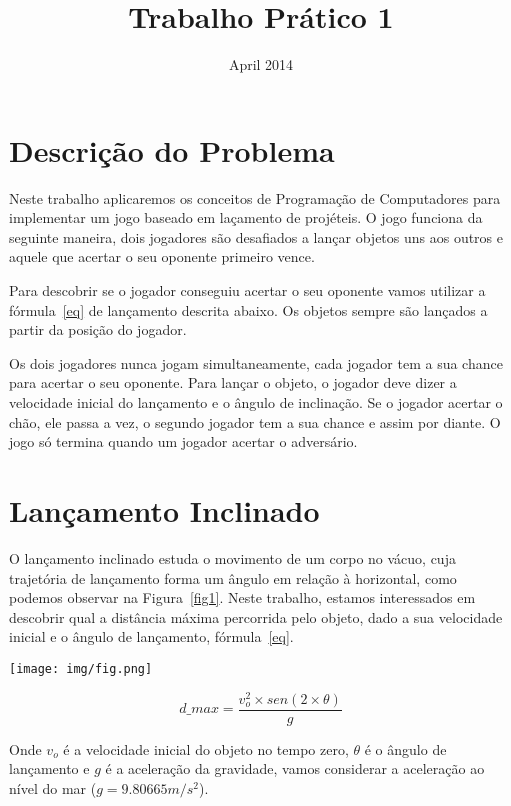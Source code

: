 \documentclass{article}
\title{Trabalho Prático 1}
\date{April 2014}
\begin{document}
\maketitle

\section{Descrição do Problema}
    Neste trabalho aplicaremos os conceitos de Programação de Computadores para implementar um jogo baseado em laçamento de projéteis. O jogo funciona da seguinte maneira, dois jogadores são desafiados a lançar objetos uns aos outros e aquele que acertar o seu oponente primeiro vence. 
    
    Para descobrir se o jogador conseguiu acertar o seu oponente vamos utilizar a fórmula~\ref{eq} de lançamento descrita abaixo. Os objetos sempre são lançados a partir da posição do jogador. 
    
    Os dois jogadores nunca jogam simultaneamente, cada jogador tem a sua chance para acertar o seu oponente. Para lançar o objeto, o jogador deve dizer a velocidade inicial do lançamento e o ângulo de inclinação. Se o jogador acertar o chão, ele passa a vez, o segundo jogador tem a sua chance e assim por diante. O jogo só termina quando um jogador acertar o adversário. 

\section{Lançamento Inclinado}
    O lançamento inclinado estuda o movimento de um corpo no vácuo, cuja trajetória de lançamento forma um ângulo em relação à horizontal, como podemos observar na Figura~\ref{fig1}. Neste trabalho, estamos interessados em descobrir qual a distância máxima percorrida pelo objeto, dado a sua velocidade inicial e o ângulo de lançamento, fórmula~\ref{eq}.

\begin{center}
\texttt{[image: img/fig.png]}
\label{fig1}
\end{center}
    
\begin{equation}
d\_{max} = \frac{v_o^2 \times sen(2\times \theta)}{g}
\label{eq}
\end{equation}

Onde $v_o$ é a velocidade inicial do objeto no tempo zero, $\theta$ é o ângulo de lançamento e $g$ é a aceleração da gravidade, vamos considerar a aceleração ao nível do mar ($g = 9.80665 m/s^2$).
\end{document}
